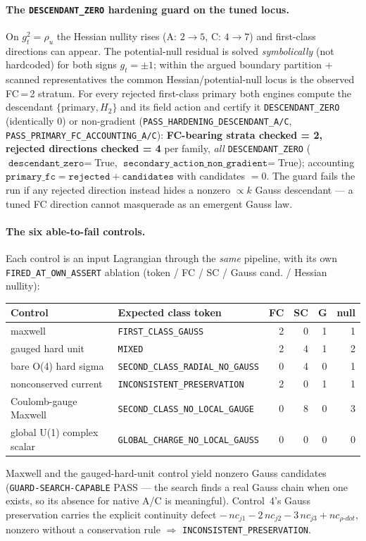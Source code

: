 \paragraph{The \texttt{DESCENDANT\_ZERO} hardening guard on the tuned locus.}
On \(g_t^2=\rho_u\) the Hessian nullity rises (A: \(2\to5\), C: \(4\to7\)) and
first-class directions can appear. The potential-null residual is solved
\emph{symbolically} (not hardcoded) for both signs \(g_t=\pm1\); within the argued
boundary partition + scanned representatives the common Hessian/potential-null
locus is the observed FC\,=\,2 stratum. For every rejected first-class primary both
engines compute the descendant \(\{\mathrm{primary},H_2\}\) and its field action
and certify it \texttt{DESCENDANT\_ZERO} (identically \(0\)) or non-gradient
(\texttt{PASS\_HARDENING\_DESCENDANT\_A/C}, \texttt{PASS\_PRIMARY\_FC\_ACCOUNTING\_A/C}):
\textbf{FC-bearing strata checked = 2, rejected directions checked = 4} per family,
\emph{all} \texttt{DESCENDANT\_ZERO} (\(\texttt{descendant\_zero}=\)True,
\(\texttt{secondary\_action\_non\_gradient}=\)True); accounting
\(\texttt{primary\_fc}=\texttt{rejected}+\texttt{candidates}\) with candidates \(=0\).
The guard fails the run if any rejected direction instead hides a nonzero
\(\propto k\) Gauss descendant --- a tuned FC direction cannot masquerade as an
emergent Gauss law.

\paragraph{The six able-to-fail controls.}
Each control is an input Lagrangian through the \emph{same} pipeline, with its own
\texttt{FIRED\_AT\_OWN\_ASSERT} ablation (token / FC / SC / Gauss cand. / Hessian
nullity):

\begin{center}
\begin{tabular}{llrrrr}
\hline
Control & Expected class token & FC & SC & G & null \\
\hline
maxwell & \texttt{FIRST\_CLASS\_GAUSS} & 2 & 0 & 1 & 1 \\
gauged hard unit & \texttt{MIXED} & 2 & 4 & 1 & 2 \\
bare O(4) hard sigma & \texttt{SECOND\_CLASS\_RADIAL\_NO\_GAUSS} & 0 & 4 & 0 & 1 \\
nonconserved current & \texttt{INCONSISTENT\_PRESERVATION} & 2 & 0 & 1 & 1 \\
Coulomb-gauge Maxwell & \texttt{SECOND\_CLASS\_NO\_LOCAL\_GAUGE} & 0 & 8 & 0 & 3 \\
global U(1) complex scalar & \texttt{GLOBAL\_CHARGE\_NO\_LOCAL\_GAUSS} & 0 & 0 & 0 & 0 \\
\hline
\end{tabular}
\end{center}
Maxwell and the gauged-hard-unit control yield nonzero Gauss candidates
(\texttt{GUARD-SEARCH-CAPABLE} PASS --- the search finds a real Gauss chain when one
exists, so its absence for native A/C is meaningful). Control~4's Gauss
preservation carries the explicit continuity defect
\(-\,nc_{j1}-2\,nc_{j2}-3\,nc_{j3}+nc_{\rho\text{-}dot}\), nonzero without a
conservation rule \(\Rightarrow\) \texttt{INCONSISTENT\_PRESERVATION}.

